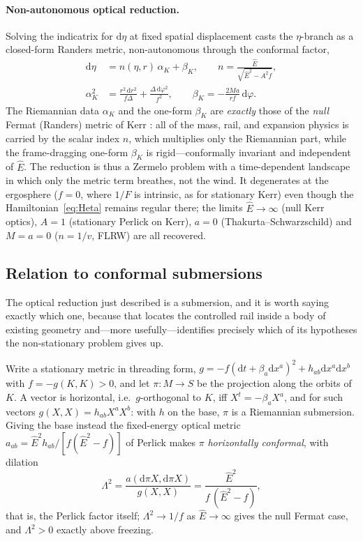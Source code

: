 \documentclass[12pt]{iopart}
\theoremstyle{plain}
\theoremstyle{definition}
\theoremstyle{remark}
\newcommand{\Ehat}{\hat E}
\newcommand{\dd}{\mathrm{d}}
\begin{document}
\paragraph{Non-autonomous optical reduction.} Solving the indicatrix for
$\dd\eta$ at fixed spatial displacement casts the $\eta$-branch as a closed-form
Randers metric, non-autonomous through the conformal factor,
\begin{align}
    \dd\eta &= n(\eta,r)\,\alpha_K+\beta_K,\qquad
    n=\frac{\Ehat}{\sqrt{\Ehat^2-A^2 f}},
    \label{eq:randers}\\
    \alpha_K^2 &= \frac{r^2\,\dd r^2}{f\Delta}+\frac{\Delta\,\dd\varphi^2}{f^2},
    \qquad
    \beta_K = -\frac{2Ma}{rf}\,\dd\varphi.
    \label{eq:randers-data}
\end{align}
The Riemannian data $\alpha_K$ and the one-form $\beta_K$ are \emph{exactly} those
of the \emph{null} Fermat (Randers) metric of Kerr \cite{GibbonsWerner2008}: all
of the mass, rail, and expansion physics is carried by the scalar index $n$,
which multiplies only the Riemannian part, while the frame-dragging one-form
$\beta_K$ is rigid---conformally invariant and independent of $\Ehat$. The
reduction is thus a Zermelo problem with a time-dependent landscape in which only
the metric term breathes, not the wind. It degenerates at the ergosphere ($f=0$,
where $1/F$ is intrinsic, as for stationary Kerr) even though the
Hamiltonian~\eqref{eq:Heta} remains regular there; the limits $\Ehat\to\infty$
(null Kerr optics), $A=1$ (stationary Perlick on Kerr), $a=0$
(Thakurta--Schwarzschild) and $M=a=0$ ($n=1/v$, FLRW) are all recovered.

\subsection{Relation to conformal submersions}
\label{sec:submersion}
The optical reduction just described is a submersion, and it is worth saying
exactly which one, because that locates the controlled rail inside a body of
existing geometry and---more usefully---identifies precisely which of its
hypotheses the non-stationary problem gives up.

Write a stationary metric in threading form,
$g=-f(\dd t+\beta_a\dd x^a)^2+h_{ab}\dd x^a\dd x^b$ with $f=-g(K,K)>0$, and let
$\pi:M\to S$ be the projection along the orbits of $K$. A vector is horizontal,
i.e.\ $g$-orthogonal to $K$, iff $X^t=-\beta_aX^a$, and for such vectors
$g(X,X)=h_{ab}X^aX^b$: with $h$ on the base, $\pi$ is a Riemannian submersion.
Giving the base instead the fixed-energy optical metric
$a_{ab}=\Ehat^2h_{ab}/[f(\Ehat^2-f)]$ of Perlick \cite{Perlick1991} makes $\pi$
\emph{horizontally conformal}, with dilation
\begin{equation}
    \Lambda^2=\frac{a(\dd\pi X,\dd\pi X)}{g(X,X)}
      =\frac{\Ehat^2}{f\,(\Ehat^2-f)} ,
    \label{eq:dilation}
\end{equation}
that is, the Perlick factor itself; $\Lambda^2\to1/f$ as $\Ehat\to\infty$ gives
the null Fermat case, and $\Lambda^2>0$ exactly above freezing.
\end{document}
